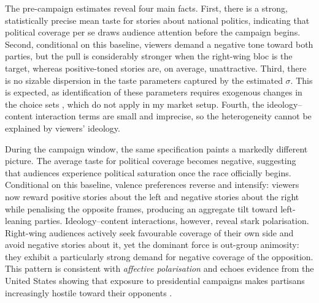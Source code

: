 \documentclass[12pt]{article}
\begin{document}
	The pre-campaign estimates reveal four main facts. First, there is a strong, statistically precise mean taste for stories about national politics, indicating that political coverage per se draws audience attention before the campaign begins. Second, conditional on this baseline, viewers demand a negative tone toward both parties, but the pull is considerably stronger when the right-wing bloc is the target, whereas positive-toned stories are, on average, unattractive. Third, there is no sizable dispersion in the taste parameters captured by the estimated $\sigma$. This is expected, as identification of these parameters requires exogenous changes in the choice sets \citep{berry_haile_econometrica}, which do not apply in my market setup. Fourth, the ideology–content interaction terms are small and imprecise, so the heterogeneity cannot be explained by viewers’ ideology.
	
	During the campaign window, the same specification paints a markedly different picture. The average taste for political coverage becomes negative, suggesting that audiences experience political saturation once the race officially begins. Conditional on this baseline, valence preferences reverse and intensify: viewers now reward positive stories about the left and negative stories about the right while penalising the opposite frames, producing an aggregate tilt toward left-leaning parties. Ideology–content interactions, however, reveal stark polarisation. Right-wing audiences actively seek favourable coverage of their own side and avoid negative stories about it, yet the dominant force is out-group animosity: they exhibit a particularly strong demand for negative coverage of the opposition. This pattern is consistent with \emph{affective polarisation} and echoes evidence from the United States showing that exposure to presidential campaigns makes partisans increasingly hostile toward their opponents \citep{Peterson2017Echo}.
	
	
	
	
	
\end{document}
